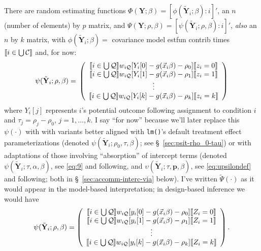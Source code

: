 \documentclass{article}
\DeclarePairedDelimiter{\indicator}{\llbracket}{\rrbracket}
\begin{document}
There are random estimating functions $\Phi(\mathbf{Y}; \beta ) =
[\phi(\tilde{\mathbf{Y}}_{i};
\beta) : i]'$, an $n$ (number of elements) by $p$ matrix,  and 
       $\Psi(\mathbf{Y}; \rho, \beta) = [\psi(\tilde{\mathbf{Y}}_{i};
       \rho, \beta): i]'$, \textit{also} an $n$ by $k$ matrix, with 
       $\phi(\tilde{\mathbf{Y}}_{i}; \beta)=$ covariance model estfun
       contrib times $\indicator{i \in \bigcup \mathcal{C}}$ and, for now:
\begin{equation}
         \label{eq:5}
         \psi(\tilde{\mathbf{Y}}_{i}; \rho, \beta) =\\
         \left( \begin{array}{c}
           \indicator{i \in \bigcup \mathcal{Q}}w_{i\mathcal{Q}}[Y_{i}[0] - g(\vec{x}_{i}\beta)-
                  \rho_{0}]\indicator{z_{i}=0}\\
           \indicator{i \in \bigcup \mathcal{Q}}w_{i\mathcal{Q}}[Y_{i}[1] - g(\vec{x}_{i}\beta)-
                  \rho_{1}]\indicator{z_{i}=1}\\
                  \vdots \\
           \indicator{i \in \bigcup \mathcal{Q}}w_{i\mathcal{Q}}[Y_{i}[k] - g(\vec{x}_{i}\beta)-
                  \rho_{k}]\indicator{z_{i}=k}\\                  
                \end{array}\right)
\end{equation}
where $Y_{i}[j]$ represents $i$'s potential outcome following
assignment to condition $i$ and $\tau_{j} = \rho_{j}-\rho_{0}$, $j=1,
\ldots, k$. I say ``for now'' because we'll later replace this $\psi(\cdot)$ with
with variants better aligned with \texttt{lm()}'s default treatment effect parameterizations (denoted $\psi(\tilde{\mathbf{Y}}_{i}; \rho_{0}, \tau, \beta)$; see \S~\ref{sec:psit-rho_0-tau})  or with adaptations of those involving ``absorption'' of intercept terms (denoted $\psi(\tilde{\mathbf{Y}}_{i}; \tau, \alpha, \beta)$, see \eqref{eq:9} and following, and $\upsilon(\tilde{\mathbf{Y}}_{i}; \tau, \mathbf{p}, \beta)$, see \eqref{eq:upsilondef} and following; both in \S~\ref{sec:accomm-interc-via} below).  I've written $\tilde{\Psi}(\cdot)$ as
it would appear in the model-based interpretation; in design-based
inference we would have
\begin{equation*}
           \psi(\tilde{\mathbf{Y}}_{i}; \rho, \beta) =
         \left( \begin{array}{c}
           \indicator{i \in \bigcup \mathcal{Q}}w_{i\mathcal{Q}}[y_{i}[0] - g(\vec{x}_{i}\beta)-
                  \rho_{0}]\indicator{Z_{i}=0}\\
           \indicator{i \in \bigcup \mathcal{Q}}w_{i\mathcal{Q}}[y_{i}[1] - g(\vec{x}_{i}\beta)-
                  \rho_{1}]\indicator{Z_{i}=1}\\
                  \vdots \\

           \indicator{i \in \bigcup \mathcal{Q}}w_{i\mathcal{Q}}[y_{i}[k] - g(\vec{x}_{i}\beta)-
                  \rho_{k}]\indicator{Z_{i}=k}\\                  
                \end{array}\right).
\end{equation*}
\end{document}
